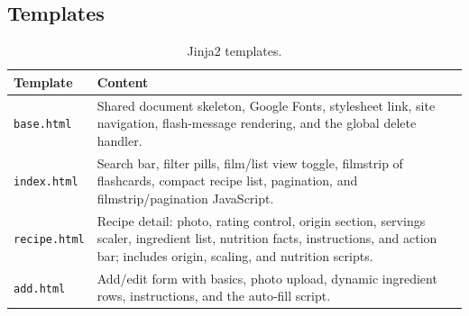 \documentclass[11pt,a4paper]{article}
\newcommand{\code}[1]{\texttt{#1}}
\begin{document}
\subsection{Templates}
\begin{table}[h]
\centering
\small
\begin{tabularx}{\textwidth}{@{}lX@{}}
\toprule
\textbf{Template} & \textbf{Content} \\
\midrule
\code{base.html}    & Shared document skeleton, Google Fonts, stylesheet link, site navigation, flash-message rendering, and the global delete handler. \\
\code{index.html}   & Search bar, filter pills, film/list view toggle, filmstrip of flashcards, compact recipe list, pagination, and filmstrip/pagination JavaScript. \\
\code{recipe.html}  & Recipe detail: photo, rating control, origin section, servings scaler, ingredient list, nutrition facts, instructions, and action bar; includes origin, scaling, and nutrition scripts. \\
\code{add.html}     & Add/edit form with basics, photo upload, dynamic ingredient rows, instructions, and the auto-fill script. \\
\bottomrule
\end{tabularx}
\caption{Jinja2 templates.}
\end{table}
\end{document}
